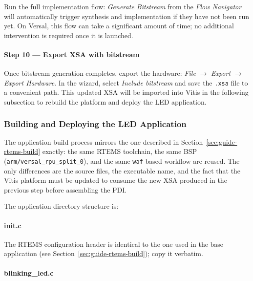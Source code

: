 \documentclass[
	a4paper,
]{CSMakotoTechnicalReport}
\begin{document}
Run the full implementation flow: \textit{Generate Bitstream} from the \textit{Flow Navigator} will automatically trigger synthesis and implementation if they have not been run yet.
On Versal, this flow can take a significant amount of time; no additional intervention is required once it is launched.

\paragraph*{Step 10 --- Export XSA with bitstream}

Once bitstream generation completes, export the hardware:
\textit{File} $\to$ \textit{Export} $\to$ \textit{Export Hardware}.
In the wizard, select \textit{Include bitstream} and save the \texttt{.xsa} file to a convenient path.
This updated XSA will be imported into Vitis in the following subsection to rebuild the platform and deploy the LED application.

\subsubsection{Building and Deploying the LED Application}
\label{sec:guide-led-app}

The application build process mirrors the one described in Section~\ref{sec:guide-rtems-build} exactly: the same RTEMS toolchain, the same BSP (\texttt{arm/versal\_rpu\_split\_0}), and the same \texttt{waf}-based workflow are reused.
The only differences are the source files, the executable name, and the fact that the Vitis platform must be updated to consume the new XSA produced in the previous step before assembling the PDI.

The application directory structure is:


\paragraph*{init.c}

The RTEMS configuration header is identical to the one used in the base application (see Section~\ref{sec:guide-rtems-build}); copy it verbatim.

\paragraph*{blinking\_led.c}
\end{document}
